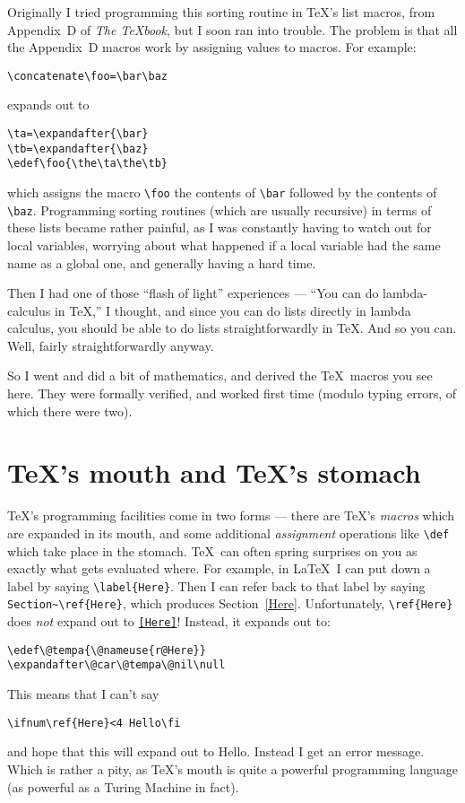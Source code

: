 Originally I tried programming this sorting routine in \TeX's
list macros, from Appendix~D of \textsl{The \TeX{}book}, but I soon ran
into trouble.
The problem is that all the Appendix~D macros work by assigning
values to macros.  For example:
\begin{verbatim}
\concatenate\foo=\bar\baz
\end{verbatim}
expands out to
\begin{verbatim}
\ta=\expandafter{\bar}
\tb=\expandafter{\baz}
\edef\foo{\the\ta\the\tb}
\end{verbatim}
which assigns the macro \verb|\foo| the contents of \verb|\bar|
followed by the contents of \verb|\baz|.  Programming sorting routines
(which are usually recursive) in terms of these lists became rather
painful, as I was constantly having to watch out for local variables,
worrying about what happened if a local variable had the same name
as a global one, and generally having a hard time.

Then I had one of those ``flash of light'' experiences ---
``You can do lambda-calculus in \TeX,'' I thought,
and since you can do lists directly in lambda calculus, 
you should be able to do lists straightforwardly in \TeX.  And so you
can.  Well, fairly straightforwardly anyway.

So I went and did a bit of mathematics, and derived the \TeX\ macros
you see here.  They were formally verified, and worked first time
(modulo typing errors, of which there were two).

\section{\TeX's mouth and \TeX's stomach}

\TeX's programming facilities come in two forms --- there are \TeX's
{\em macros\/} which are expanded in its mouth, and some additional 
{\em assignment\/} operations like \verb|\def| which take place in the
stomach.  \TeX\ can often spring surprises on you as exactly what
gets evaluated where.
For example, in \LaTeX\ I can put down a
label by saying \verb|\label{Here}|.
\label{Here}
Then I can refer back to that label by saying
\verb|Section~\ref{Here}|, which
produces Section~\ref{Here}.  Unfortunately, \verb|\ref{Here}| does
{\em not\/} expand out to {\tt\ref{Here}}!  Instead, it expands out to:
\begin{verbatim}
\edef\@tempa{\@nameuse{r@Here}}
\expandafter\@car\@tempa\@nil\null
\end{verbatim}
This means that I can't say 
\begin{verbatim}
\ifnum\ref{Here}<4 Hello\fi
\end{verbatim} 
and hope that this will expand out to Hello.  Instead I 
get an error message.  Which is rather a pity, as \TeX's mouth is
quite a powerful programming language (as powerful as a Turing Machine in
fact).  

